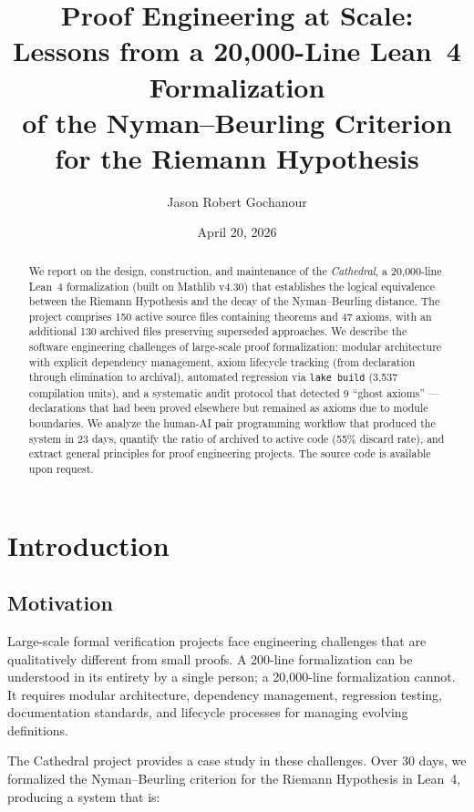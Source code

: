 \documentclass[11pt,a4paper]{article}
\title{%
  Proof Engineering at Scale:\\
  Lessons from a 20,000-Line Lean~4 Formalization\\
  of the Nyman--Beurling Criterion for the Riemann Hypothesis%
}
\author{
  Jason Robert Gochanour
}
\date{April 20, 2026}
\begin{document}
\maketitle

\begin{abstract}
We report on the design, construction, and maintenance of the
\emph{Cathedral}, a 20,000-line Lean~4 formalization (built on
Mathlib v4.30) that establishes the logical equivalence between
the Riemann Hypothesis and the decay of the Nyman--Beurling
distance. The project comprises 150 active source files containing
theorems and 47 axioms, with an additional 130 archived files
preserving superseded approaches. We describe the software
engineering challenges of large-scale proof formalization:
modular architecture with explicit dependency management, axiom
lifecycle tracking (from declaration through elimination to
archival), automated regression via \texttt{lake build} (3,537
compilation units), and a systematic audit protocol that detected
9 ``ghost axioms'' --- declarations that had been proved elsewhere
but remained as axioms due to module boundaries. We analyze the
human-AI pair programming workflow that produced the system in 23
days, quantify the ratio of archived to active code (55\%
discard rate), and extract general principles for proof engineering
projects. The source code is available upon request.
\end{abstract}

\tableofcontents

\section{Introduction}

\subsection{Motivation}

Large-scale formal verification projects face engineering challenges
that are qualitatively different from small proofs. A 200-line
formalization can be understood in its entirety by a single person;
a 20,000-line formalization cannot. It requires modular architecture,
dependency management, regression testing, documentation standards,
and lifecycle processes for managing evolving definitions.

The Cathedral project provides a case study in these challenges. Over
30 days, we formalized the Nyman--Beurling criterion for the Riemann
Hypothesis in Lean~4, producing a system that is:
\end{document}
